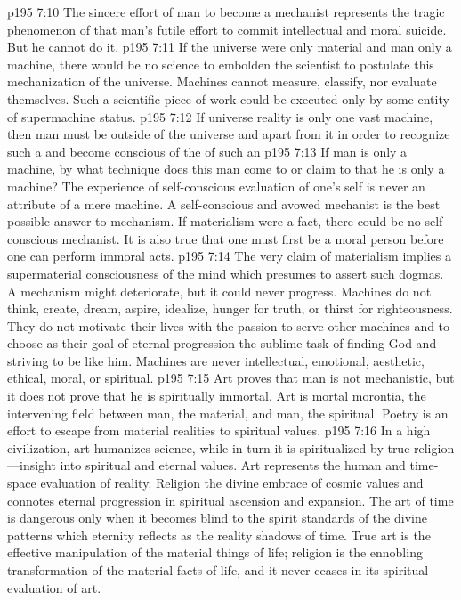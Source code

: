 \vs p195 7:10 The sincere effort of man to become a mechanist represents the tragic phenomenon of that man’s futile effort to commit intellectual and moral suicide. But he cannot do it.
\vs p195 7:11 If the universe were only material and man only a machine, there would be no science to embolden the scientist to postulate this mechanization of the universe. Machines cannot measure, classify, nor evaluate themselves. Such a scientific piece of work could be executed only by some entity of supermachine status.
\vs p195 7:12 If universe reality is only one vast machine, then man must be outside of the universe and apart from it in order to recognize such a  and become conscious of the  of such an 
\pc \vs p195 7:13 If man is only a machine, by what technique does this man come to  or claim to  that he is only a machine? The experience of self\hyp{}conscious evaluation of one’s self is never an attribute of a mere machine. A self\hyp{}conscious and avowed mechanist is the best possible answer to mechanism. If materialism were a fact, there could be no self\hyp{}conscious mechanist. It is also true that one must first be a moral person before one can perform immoral acts.
\pc \vs p195 7:14 The very claim of materialism implies a supermaterial consciousness of the mind which presumes to assert such dogmas. A mechanism might deteriorate, but it could never progress. Machines do not think, create, dream, aspire, idealize, hunger for truth, or thirst for righteousness. They do not motivate their lives with the passion to serve other machines and to choose as their goal of eternal progression the sublime task of finding God and striving to be like him. Machines are never intellectual, emotional, aesthetic, ethical, moral, or spiritual.
\vs p195 7:15 Art proves that man is not mechanistic, but it does not prove that he is spiritually immortal. Art is mortal morontia, the intervening field between man, the material, and man, the spiritual. Poetry is an effort to escape from material realities to spiritual values.
\vs p195 7:16 In a high civilization, art humanizes science, while in turn it is spiritualized by true religion---insight into spiritual and eternal values. Art represents the human and time\hyp{}space evaluation of reality. Religion  the divine embrace of cosmic values and connotes eternal progression in spiritual ascension and expansion. The art of time is dangerous only when it becomes blind to the spirit standards of the divine patterns which eternity reflects as the reality shadows of time. True art is the effective manipulation of the material things of life; religion is the ennobling transformation of the material facts of life, and it never ceases in its spiritual evaluation of art.
